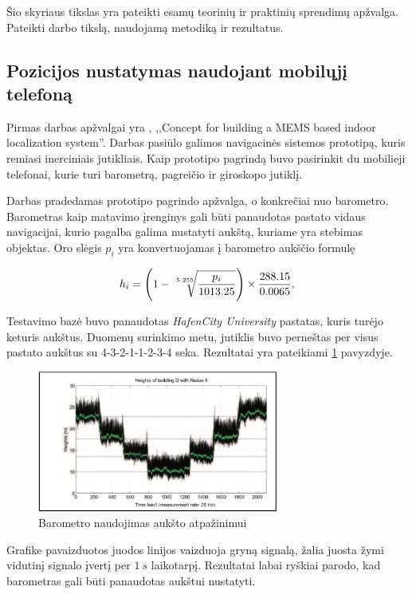Šio skyriaus tikslas yra pateikti esamų teorinių ir praktinių sprendimų apžvalga. Pateikti darbo tikslą, naudojamą metodiką ir rezultatus.

\subsection{Pozicijos nustatymas naudojant mobilųjį telefoną}

Pirmas darbas apžvalgai yra \cite{willemsenconcept}, ,,Concept for building a MEMS based indoor localization system''. Darbas pasiūlo galimos navigacinės sistemos prototipą, kuris remiasi inerciniais jutikliais. Kaip prototipo pagrindą buvo pasirinkit du mobilieji telefonai, kurie turi barometrą, pagreičio ir giroskopo jutiklį.

Darbas pradedamas prototipo pagrindo apžvalga, o konkrečiai nuo barometro. Barometras kaip matavimo įrenginys gali būti panaudotas pastato vidaus navigacijai, kurio pagalba galima nustatyti aukštą, kuriame yra stebimas objektas. Oro slėgis $p_i$ yra konvertuojamas į barometro aukščio formulę

\begin{equation}
    h_i = \Bigg( 1 - \sqrt[\leftroot{-2}\uproot{2}5.255]{ \frac{p_i}{1013.25} } \Bigg) \times \frac{288.15}{0.0065},
\end{equation}

Testavimo bazė buvo panaudotas \textit{HafenCity University} pastatas, kuris turėjo keturis aukštus. Duomenų surinkimo metu, jutiklis buvo perneštas per visus pastato aukštus su 4-3-2-1-1-2-3-4 seka. Rezultatai yra pateikiami \ref{fig:floor_detection_with_barometer_data} pavyzdyje.

\begin{figure}[H]
    \centering
    \includegraphics[width=300px]{img/floor_detection_with_barometer_data.png}
    \caption{Barometro naudojimas aukšto atpažinimui \cite{willemsenconcept}}
    \label{fig:floor_detection_with_barometer_data}
\end{figure}

Grafike pavaizduotos juodos linijos vaizduoja gryną signalą, žalia juosta žymi vidutinį signalo įvertį per $1~s$ laikotarpį. Rezultatai labai ryškiai parodo, kad barometras gali būti panaudotas aukštui nustatyti.

